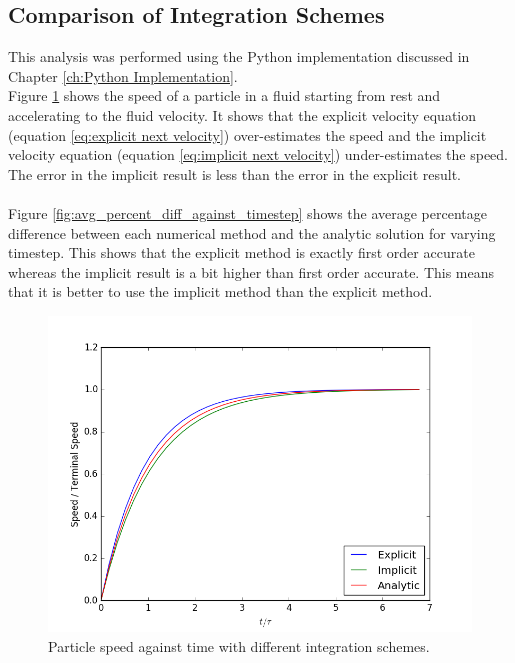 \documentclass[10pt,a4paper,titlepage]{report}
\begin{document}
\subsection{Comparison of Integration Schemes}
\label{sec:integration scheme comparison}
This analysis was performed using the Python implementation discussed in Chapter \ref{ch:Python Implementation}.
\\Figure \ref{fig:terminal_velocity_implicit_explicit} shows the speed of a particle in a fluid starting from rest and accelerating to the fluid velocity. It shows that the explicit velocity equation (equation \ref{eq:explicit next velocity}) over-estimates the speed and the implicit velocity equation (equation \ref{eq:implicit next velocity}) under-estimates the speed. The error in the implicit result is less than the error in the explicit result.
\\\\Figure \ref{fig:avg_percent_diff_against_timestep} shows the average percentage difference between each numerical method and the analytic solution for varying timestep. This shows that the explicit method is exactly first order accurate whereas the implicit result is a bit higher than first order accurate. This means that it is better to use the implicit method than the explicit method.
\begin{figure}[!htb]
\centering
\includegraphics[scale=0.6]{figures/TerminalVelocityImplicitExplicit.png}
\caption{Particle speed against time with different integration schemes.}
\label{fig:terminal_velocity_implicit_explicit}
\end{figure}
\end{document}
